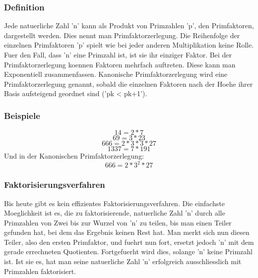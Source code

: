 \subsubsection{Definition}
Jede natuerliche Zahl 'n' kann als Produkt von Primzahlen 'p', den Primfaktoren, dargestellt werden. Dies nennt man Primfaktorzerlegung. Die Reihenfolge der einzelnen Primfaktoren 'p' spielt wie bei jeder anderen Multiplikation keine Rolle. Fuer den Fall, dass 'n' eine Primzahl ist, ist sie ihr einziger Faktor. Bei der Primfaktorzerlegung koennen Faktoren mehrfach auftreten. Diese kann man Exponentiell zusammenfassen. Kanonische Primfaktorzerlegung wird eine Primfaktorzerlegung genannt, sobald die einzelnen Faktoren nach der Hoehe ihrer Basis aufsteigend geordnet sind ('pk < pk+1').
\subsubsection{Beispiele}
\begin{equation}
14 = 2 * 7
\end{equation}
\begin{equation}
69 = 3 * 23
\end{equation}
\begin{equation}
666 = 2 * 3 * 3 * 27
\end{equation}
\begin{equation}
1337 = 7 * 191
\end{equation}
Und in der Kanonischen Primfaktorzerlegung:
\begin{equation}
666 = 2 * 3^2 * 27
\end{equation}
\subsubsection{Faktorisierungsverfahren}
Bis heute gibt es kein effizientes Faktorisierungsverfahren. Die einfachste Moeglichkeit ist es, die zu faktorisierende, natuerliche Zahl 'n' durch alle Primzahlen von Zwei bis zur Wurzel von 'n' zu teilen, bis man einen Teiler gefunden hat, bei dem das Ergebnis keinen Rest hat. Man merkt sich nun diesen Teiler, also den ersten Primfaktor, und fuehrt nun fort, ersetzt jedoch 'n' mit dem gerade errechneten Quotienten. Fortgefuerht wird dies, solange 'n' keine Primzahl ist. Ist sie es, hat man seine natuerliche Zahl 'n' erfolgreich ausschliesslich mit Primzahlen faktorisiert.
